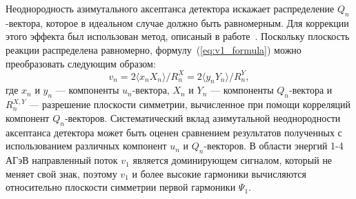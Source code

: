 Неоднородность азимутального аксептанса детектора  искажает распределение $Q_n$-вектора, которое в идеальном случае должно быть равномерным. 
Для коррекции этого эффекта был использован метод, описаный в работе~\cite{Selyuzhenkov:2007zi}.
Поскольку плоскость реакции распределена равномерно, формулу~(\ref{eq:v1_formula}) можно преобразовать следующим образом:
%
\begin{equation}
    v_n =  2 \langle x_n X_n \rangle/R_n^X = 2 \langle y_n Y_n \rangle/R_n^Y,
    \label{eq:v1xy_formula}
\end{equation}
%
где $x_n$ и $y_n$ --- компоненты $u_n$-вектора, $X_n$ и $Y_n$ --- компоненты $Q_n$-вектора и $R_n^{X,Y}$ --- разрешение плоскости симметрии, вычисленное при помощи корреляций компонент $Q_n$-векторов.
Систематический вклад азимутальной неоднородности аксептанса детектора может быть оценен сравнением результатов полученных с использованием различных компонент $u_n$ и $Q_n$-векторов. 
В области энергий 1-4 АГэВ направленный поток $v_1$ является доминирующем сигналом, который не меняет свой знак,  поэтому $v_1$ и более высокие гармоники вычисляются относительно  плоскости симметрии первой гармоники $\Psi_1$.\\

